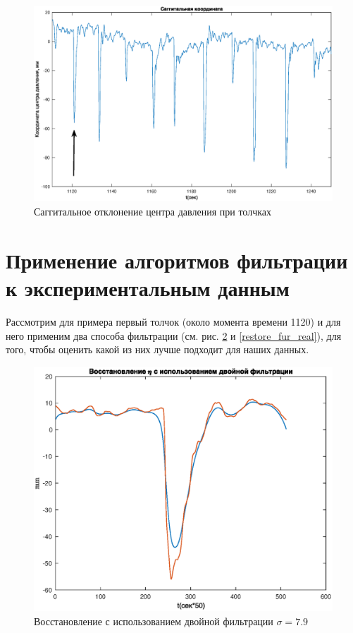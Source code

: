 \documentclass[a4paper,12pt, openany]{book}
\theoremstyle{plain} %
\theoremstyle{definition} %
\theoremstyle{remark} %
\numberwithin{equation}{chapter}
\begin{document}
{\begin{figure}[h!]
    \centering
    \includegraphics[width=0.9\linewidth]{y_real.eps}
    \caption{Саггитальное отклонение центра давления при толчках}
    \label{y_real}
\end{figure}



\section{Применение алгоритмов фильтрации к экспериментальным данным}
Рассмотрим для примера первый толчок (около момента времени 1120) и для него применим два способа
фильтрации (см. рис. \ref{restore_double_real} и \ref{restore_fur_real}), для того, 
чтобы оценить какой из них лучше подходит для наших данных.

\begin{figure}[h!]
    \centering
    \includegraphics[width=0.65\linewidth]{restore_eta_double_real.eps}
    \caption{Восстановление с использованием двойной фильтрации $\sigma=7.9$}
    \label{restore_double_real}
\end{figure}

}
\end{document}
